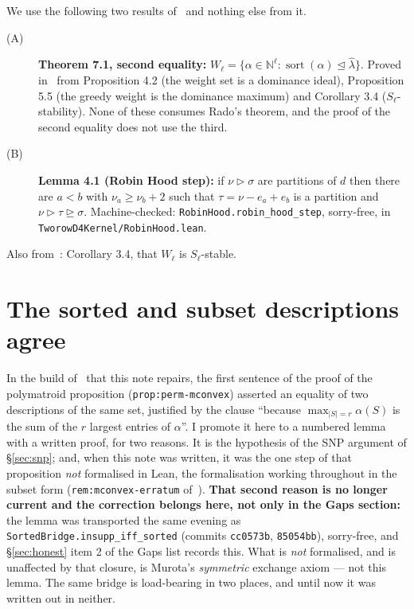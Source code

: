 \documentclass[11pt]{article}
\theoremstyle{plain}
\theoremstyle{definition}
\DeclareMathOperator{\srt}{sort}
\newcommand{\N}{\mathbb{N}}
\newcommand{\lhat}{\hat\lambda}
\begin{document}
We use the following two results of~\cite{note1} and nothing else from it.

\begin{description}
\item[(A)] \textbf{Theorem 7.1, second equality:}
  $W_\ell=\{\alpha\in\N^{\ell}:\srt(\alpha)\trianglelefteq\lhat\}$. Proved
  in~\cite{note1} from Proposition 4.2 (the weight set is a dominance ideal),
  Proposition 5.5 (the greedy weight is the dominance maximum) and Corollary 3.4
  ($S_\ell$-stability). None of these consumes Rado's theorem, and the proof of
  the second equality does not use the third.
\item[(B)] \textbf{Lemma 4.1 (Robin Hood step):} if $\nu\rhd\sigma$ are
  partitions of $d$ then there are $a<b$ with $\nu_a\ge\nu_b+2$ such that
  $\tau=\nu-e_a+e_b$ is a partition and $\nu\rhd\tau\trianglerighteq\sigma$.
  Machine-checked: \texttt{RobinHood.robin\_hood\_step}, sorry-free, in
  \texttt{TworowD4Kernel/RobinHood.lean}.
\end{description}

Also from~\cite{note1}: Corollary 3.4, that $W_\ell$ is $S_\ell$-stable.

\section{The sorted and subset descriptions agree}\label{sec:JJ}

In the build of~\cite{note1} that this note repairs, the first sentence of the proof of the
polymatroid proposition (\texttt{prop:perm-mconvex}) asserted an
equality of two descriptions of the same set, justified by the clause ``because
$\max_{|S|=r}\alpha(S)$ is the sum of the $r$ largest entries of $\alpha$''. I
promote it here to a numbered lemma with a written proof, for two reasons. It is
the hypothesis of the SNP argument of \S\ref{sec:snp}; and, when this note was
written, it was the one step of that proposition \emph{not} formalised in Lean, the
formalisation working throughout in the subset form (\texttt{rem:mconvex-erratum}
of~\cite{note1}). \textbf{That second reason is no longer current and the correction
belongs here, not only in the Gaps section:} the lemma was transported the same evening as
\texttt{SortedBridge.insupp\_iff\_sorted} (commits \texttt{cc0573b}, \texttt{85054bb}),
sorry-free, and \S\ref{sec:honest} item 2 of the Gaps list records this. What is
\emph{not} formalised, and is unaffected by that closure, is Murota's \emph{symmetric}
exchange axiom --- not this lemma. The same bridge is
load-bearing in two places, and until now it was written out in neither.
\end{document}
